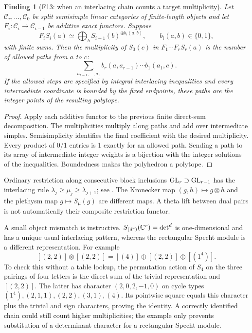 \documentclass[11pt,a4paper]{article}
\newcommand{\mathscr}{\mathcal}
\newcommand{\fid}[1]{\textsf{#1}}\newcommand{\gate}[1]{\textsf{#1}}
\theoremstyle{named}\newtheorem{finding}{Finding}[section]
\theoremstyle{definition}\newtheorem{definition}[finding]{Definition}
\theoremstyle{remark}\newtheorem{remark}[finding]{Remark}
\begin{document}
\begin{finding}[\fid{F13}: when an interlacing chain counts a target multiplicity]\label{f:branching}
Let $\mathscr C_r,\ldots,\mathscr C_0$ be split semisimple linear categories of finite-length objects and let $F_i:\mathscr C_i\to\mathscr C_{i-1}$ be additive exact functors. Suppose
\[
 F_i S_i(a)\simeq\bigoplus_b S_{i-1}(b)^{\oplus b_i(a,b)},\qquad b_i(a,b)\in\{0,1\},
\]
with finite sums. Then the multiplicity of $S_0(c)$ in $F_1\cdots F_rS_r(a)$ is the number of allowed paths from $a$ to $c$:
\[
 \sum_{a_{r-1},\ldots,a_1}
 b_r(a,a_{r-1})\cdots b_1(a_1,c).
\]
If the allowed steps are specified by integral interlacing inequalities and every intermediate coordinate is bounded by the fixed endpoints, these paths are the integer points of the resulting polytope.
\end{finding}
\begin{proof}
Apply each additive functor to the previous finite direct-sum decomposition. The multiplicities multiply along paths and add over intermediate simples. Semisimplicity identifies the final coefficient with the desired multiplicity. Every product of 0/1 entries is 1 exactly for an allowed path. Sending a path to its array of intermediate integer weights is a bijection with the integer solutions of the inequalities. Boundedness makes the polyhedron a polytope.
\end{proof}
Ordinary restriction along consecutive block inclusions $\mathrm{GL}_r\supset\mathrm{GL}_{r-1}$ has the interlacing rule $\lambda_j\ge\mu_j\ge\lambda_{j+1}$; see \cite[Theorem 2.1, equation (2.2), and the patterns (2.4)]{Molev}. The Kronecker map $(g,h)\mapsto g\otimes h$ and the plethysm map $g\mapsto S_\mu(g)$ are different maps. A theta lift between dual pairs is not automatically their composite restriction functor.

A small object mismatch is instructive. $S_{(d^r)}(\mathbb C^r)=\det^d$ is one-dimensional and has a unique usual interlacing pattern, whereas the rectangular Specht module is a different representation. For example
\[
 [(2,2)]\otimes[(2,2)]=[(4)]\oplus[(2,2)]\oplus[(1^4)].
\]
To check this without a table lookup, the permutation action of $S_4$ on the three pairings of four letters is the direct sum of the trivial representation and $[(2,2)]$. The latter has character $(2,0,2,-1,0)$ on cycle types $(1^4),(2,1,1),(2,2),(3,1),(4)$. Its pointwise square equals this character plus the trivial and sign characters, proving the identity. A correctly identified chain could still count higher multiplicities; the example only prevents substitution of a determinant character for a rectangular Specht module.
\end{document}
